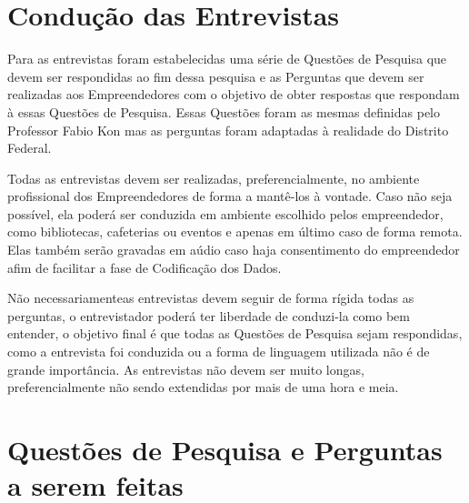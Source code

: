 \section{Condução das Entrevistas}
\label{section:conducao_das_entrevistas}

Para as entrevistas foram estabelecidas uma série de Questões de Pesquisa que devem ser respondidas ao fim dessa pesquisa e as Perguntas que devem ser realizadas aos Empreendedores com o objetivo de
obter respostas que respondam à essas Questões de Pesquisa. Essas Questões foram as mesmas definidas pelo Professor Fabio Kon mas as perguntas foram adaptadas à realidade do Distrito Federal.

Todas as entrevistas devem ser realizadas, preferencialmente, no ambiente profissional dos Empreendedores de forma a mantê-los à vontade. Caso não seja possível, ela poderá ser conduzida em ambiente
escolhido pelos empreendedor, como bibliotecas, cafeterias ou eventos e apenas em último caso de forma remota. Elas também serão gravadas em aúdio caso haja consentimento do empreendedor afim de
facilitar a fase de Codificação dos Dados.

Não necessariamenteas entrevistas devem seguir de forma rígida todas as perguntas, o entrevistador poderá ter liberdade de conduzi-la como bem entender, o objetivo final é que todas as Questões de Pesquisa
sejam respondidas, como a entrevista foi conduzida ou a forma de linguagem utilizada não é de grande importância. As entrevistas não devem ser muito longas, preferencialmente não sendo extendidas por mais
de uma hora e meia.

\section{Questões de Pesquisa e Perguntas a serem feitas}
\label{section:questoes_de_pesquisa_e_perguntas}

